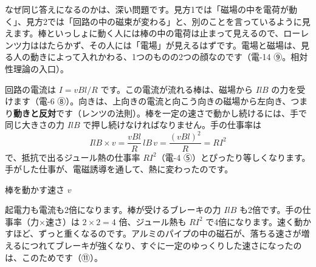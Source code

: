 なぜ同じ答えになるのかは、深い問題です。見方1では「磁場の中を電荷が動く」、見方2では「回路の中の磁束が変わる」と、別のことを言っているように見えます。棒といっしょに動く人には棒の中の電荷は止まって見えるので、ローレンツ力ははたらかず、その人には「電場」が見えるはずです。電場と磁場は、見る人の動きによって入れかわる、1つのものの2つの顔なのです（電-14 ⑨。相対性理論の入口）。

回路の電流は $I=vBl/R$ です。この電流が流れる棒は、磁場から $IlB$ の力を受けます（電-6 ⑧）。向きは、上向きの電流と向こう向きの磁場から左向き、つまり\textbf{動きと反対}です（レンツの法則）。棒を一定の速さで動かし続けるには、手で同じ大きさの力 $IlB$ で押し続けなければなりません。手の仕事率は
\[ IlB\times v=\frac{vBl}{R}\,lB\,v=\frac{(vBl)^2}{R}=RI^2 \]
で、抵抗で出るジュール熱の仕事率 $RI^2$（電-4 ⑤）とぴったり等しくなります。手がした仕事が、電磁誘導を通して、熱に変わったのです。

\begin{phflow}
\end{phflow}

\begin{phbaisuru}{棒を動かす速さ $v$}
\noindent\begin{minipage}[c]{0.45\linewidth}\raggedright
起電力も電流も2倍になります。棒が受けるブレーキの力 $IlB$ も2倍です。手の仕事率（力×速さ）は $2\times2=4$ 倍、ジュール熱も $RI^2$ で4倍になります。速く動かすほど、ずっと重くなるのです。アルミのパイプの中の磁石が、落ちる速さが増えるにつれてブレーキが強くなり、すぐに一定のゆっくりした速さになったのは、このためです（⑪）。\par{}
\end{minipage}\hfill
\begin{minipage}[c]{0.53\linewidth}\centering
{}
\end{minipage}
\end{phbaisuru}

